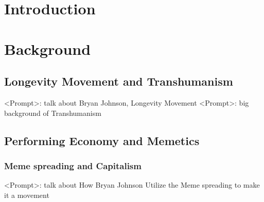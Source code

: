 \documentclass[manuscript,review]{acmart}
\begin{document}

\keywords{}


\begin{teaserfigure}
    \centering
    \Description{}
    \label{fig:teaser}
\end{teaserfigure}

\maketitle


\section{Introduction}

\section{Background}

\subsection{Longevity Movement and Transhumanism}

<Prompt>: talk about Bryan Johnson, Longevity Movement
<Prompt>: big background of Transhumanism


\subsection{Performing Economy and Memetics}

\subsubsection{Meme spreading and Capitalism}
<Prompt>: talk about How Bryan Johnson Utilize the Meme spreading to make it a movement 
\end{document}
